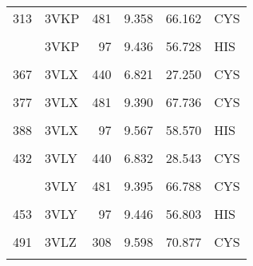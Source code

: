 \begin{table}
\begin{tabular}{llrrrl}
			313 & 3VKP & 481 & 9.358 & 66.162 & CYS\\
			\cellcolor{gray!6}{317} & \cellcolor{gray!6}{3VKP} & \cellcolor{gray!6}{485} & \cellcolor{gray!6}{3.289} & \cellcolor{gray!6}{84.887} & \cellcolor{gray!6}{CYS}\\
			\addlinespace
			323 & 3VKP & 97 & 9.436 & 56.728 & HIS\\
			\cellcolor{gray!6}{348} & \cellcolor{gray!6}{3VLX} & \cellcolor{gray!6}{238} & \cellcolor{gray!6}{13.170} & \cellcolor{gray!6}{48.585} & \cellcolor{gray!6}{HIS}\\
			367 & 3VLX & 440 & 6.821 & 27.250 & CYS\\
			\cellcolor{gray!6}{371} & \cellcolor{gray!6}{3VLX} & \cellcolor{gray!6}{446} & \cellcolor{gray!6}{6.030} & \cellcolor{gray!6}{34.574} & \cellcolor{gray!6}{CYS}\\
			377 & 3VLX & 481 & 9.390 & 67.736 & CYS\\
			\addlinespace
			\cellcolor{gray!6}{381} & \cellcolor{gray!6}{3VLX} & \cellcolor{gray!6}{485} & \cellcolor{gray!6}{3.276} & \cellcolor{gray!6}{85.502} & \cellcolor{gray!6}{CYS}\\
			388 & 3VLX & 97 & 9.567 & 58.570 & HIS\\
			\cellcolor{gray!6}{413} & \cellcolor{gray!6}{3VLY} & \cellcolor{gray!6}{238} & \cellcolor{gray!6}{12.955} & \cellcolor{gray!6}{49.000} & \cellcolor{gray!6}{HIS}\\
			432 & 3VLY & 440 & 6.832 & 28.543 & CYS\\
			\cellcolor{gray!6}{436} & \cellcolor{gray!6}{3VLY} & \cellcolor{gray!6}{446} & \cellcolor{gray!6}{5.990} & \cellcolor{gray!6}{34.282} & \cellcolor{gray!6}{CYS}\\
			\addlinespace
			442 & 3VLY & 481 & 9.395 & 66.788 & CYS\\
			\cellcolor{gray!6}{446} & \cellcolor{gray!6}{3VLY} & \cellcolor{gray!6}{485} & \cellcolor{gray!6}{3.248} & \cellcolor{gray!6}{84.134} & \cellcolor{gray!6}{CYS}\\
			453 & 3VLY & 97 & 9.446 & 56.803 & HIS\\
			\cellcolor{gray!6}{478} & \cellcolor{gray!6}{3VLZ} & \cellcolor{gray!6}{238} & \cellcolor{gray!6}{11.853} & \cellcolor{gray!6}{50.041} & \cellcolor{gray!6}{HIS}\\
			491 & 3VLZ & 308 & 9.598 & 70.877 & CYS\\
			\addlinespace
			\cellcolor{gray!6}{498} & \cellcolor{gray!6}{3VLZ} & \cellcolor{gray!6}{440} & \cellcolor{gray!6}{7.000} & \cellcolor{gray!6}{40.942} & \cellcolor{gray!6}{CYS}\\

\end{tabular}
\end{table}

